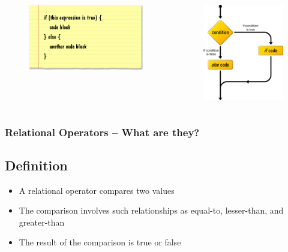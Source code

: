 \documentclass{beamer}
\begin{document}
\begin{frame}
\begin{columns}
        \begin{figure}
            \centering
            \includegraphics[scale=0.35]{if_else}
        \end{figure}
        \begin{figure}
            \centering
            \includegraphics[scale=0.3]{ifelse}
        \end{figure}
    \end{columns}
\end{frame}

\begin{frame}
    \frametitle{Relational Operators -- What are they?}
    \subsection{Definition} %
    \label{sub:definition}
    \begin{itemize}
        \item A relational operator compares two values
        \item The comparison involves such relationships as equal-to, lesser-than, and greater-than
        \item The result of the comparison is true or false
    \end{itemize}
\end{frame}
\end{document}
